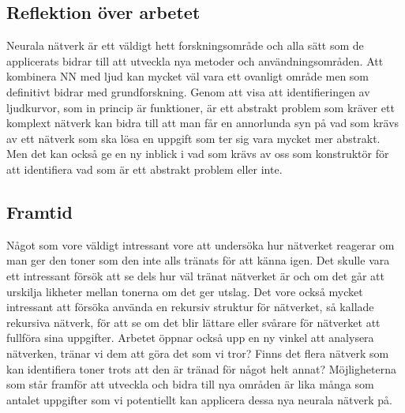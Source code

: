 \documentclass[a4paper,10pt]{article}
\begin{document}
\subsection{Reflektion över arbetet}


Neurala nätverk är ett väldigt hett forskningsområde och alla sätt som de applicerats bidrar till att utveckla nya metoder och användningsområden. Att kombinera NN med ljud kan mycket väl vara ett ovanligt område men som definitivt bidrar med grundforskning. Genom att visa att identifieringen av ljudkurvor, som in princip är funktioner, är ett abstrakt problem som kräver ett komplext nätverk kan bidra till att man får en annorlunda syn på vad som krävs av ett nätverk som ska lösa en uppgift som ter sig vara mycket mer abstrakt. Men det kan också ge en ny inblick i vad som krävs av oss som konstruktör för att identifiera vad som är ett abstrakt problem eller inte.



\subsection{Framtid}

Något som vore väldigt intressant vore att undersöka hur nätverket reagerar om man ger den toner som den inte alls tränats för att känna igen. Det skulle vara ett intressant försök att se dels hur väl tränat nätverket är och om det går att urskilja likheter mellan tonerna om det ger utslag. Det vore också mycket intressant att försöka använda en rekursiv struktur för nätverket, så kallade rekursiva nätverk, för att se om det blir lättare eller svårare för nätverket att fullföra sina uppgifter. Arbetet öppnar också upp en ny vinkel att analysera nätverken, tränar vi dem att göra det som vi tror? Finns det flera nätverk som kan identifiera toner trots att den är tränad för något helt annat? Möjligheterna som står framför att utveckla och bidra till nya områden är lika många som antalet uppgifter som vi potentiellt kan applicera dessa nya neurala nätverk på.
\end{document}
